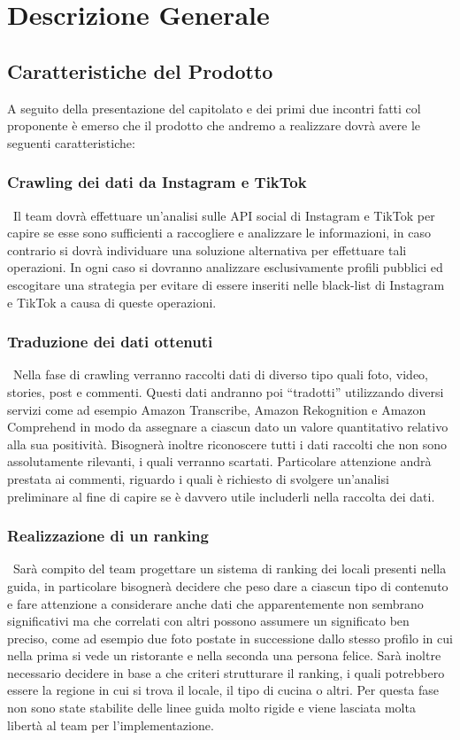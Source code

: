 \section{Descrizione Generale}

\subsection{Caratteristiche del Prodotto}

A seguito della presentazione del capitolato e dei primi due incontri fatti col proponente è emerso che il prodotto che andremo a realizzare dovrà avere le seguenti caratteristiche:

\subsubsection{Crawling dei dati da Instagram e TikTok} \ 
Il team dovrà effettuare un’analisi sulle API social di Instagram e TikTok per capire se esse sono sufficienti a raccogliere e analizzare le informazioni, in caso contrario si dovrà individuare una soluzione alternativa per effettuare tali operazioni. In ogni caso si dovranno analizzare esclusivamente profili pubblici ed escogitare una strategia per evitare di essere inseriti nelle black-list di Instagram e TikTok a causa di queste operazioni.

\subsubsection{Traduzione dei dati ottenuti} \
Nella fase di crawling verranno raccolti dati di diverso tipo quali foto, video, stories, post e commenti. Questi dati andranno poi “tradotti” utilizzando diversi servizi come ad esempio Amazon Transcribe, Amazon Rekognition e Amazon Comprehend in modo da assegnare a ciascun dato un valore quantitativo relativo alla sua positività. Bisognerà inoltre riconoscere tutti i dati raccolti che non sono assolutamente rilevanti, i quali verranno scartati. Particolare attenzione andrà prestata ai commenti, riguardo i quali è richiesto di svolgere un’analisi preliminare al fine di capire se è davvero utile includerli nella raccolta dei dati.

\subsubsection{Realizzazione di un ranking} \ 
Sarà compito del team progettare un sistema di ranking dei locali presenti nella guida, in particolare bisognerà decidere che peso dare a ciascun tipo di contenuto e fare attenzione a considerare anche dati che apparentemente non sembrano significativi ma che correlati con altri possono assumere un significato ben preciso, come ad esempio due foto postate in successione dallo stesso profilo in cui nella prima si vede un ristorante e nella seconda una persona felice. Sarà inoltre necessario decidere in base a che criteri strutturare il ranking, i quali potrebbero essere la regione in cui si trova il locale, il tipo di cucina o altri. Per questa fase non sono state stabilite delle linee guida molto rigide e viene lasciata molta libertà al team per l’implementazione.

